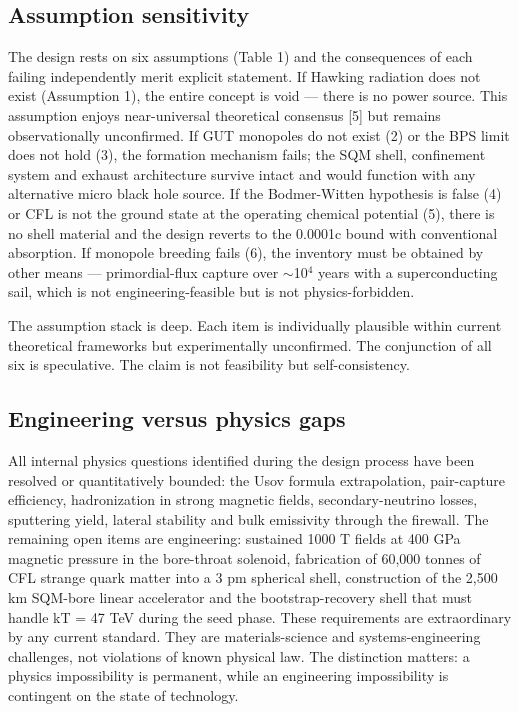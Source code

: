 \documentclass[12pt,a4paper]{article}
\begin{document}
\subsection{Assumption sensitivity}
The design rests on six assumptions (Table 1) and the consequences of each failing independently merit explicit statement. If Hawking radiation does not exist (Assumption 1), the entire concept is void --- there is no power source. This assumption enjoys near-universal theoretical consensus [5] but remains observationally unconfirmed. If GUT monopoles do not exist (2) or the BPS limit does not hold (3), the formation mechanism fails; the SQM shell, confinement system and exhaust architecture survive intact and would function with any alternative micro black hole source. If the Bodmer-Witten hypothesis is false (4) or CFL is not the ground state at the operating chemical potential (5), there is no shell material and the design reverts to the 0.0001c bound with conventional absorption. If monopole breeding fails (6), the inventory must be obtained by other means --- primordial-flux capture over $\sim$10$^{4}$ years with a superconducting sail, which is not engineering-feasible but is not physics-forbidden.

The assumption stack is deep. Each item is individually plausible within current theoretical frameworks but experimentally unconfirmed. The conjunction of all six is speculative. The claim is not feasibility but self-consistency.

\subsection{Engineering versus physics gaps}
All internal physics questions identified during the design process have been resolved or quantitatively bounded: the Usov formula extrapolation, pair-capture efficiency, hadronization in strong magnetic fields, secondary-neutrino losses, sputtering yield, lateral stability and bulk emissivity through the firewall. The remaining open items are engineering: sustained 1000 T fields at 400 GPa magnetic pressure in the bore-throat solenoid, fabrication of 60,000 tonnes of CFL strange quark matter into a 3 pm spherical shell, construction of the 2,500 km SQM-bore linear accelerator and the bootstrap-recovery shell that must handle kT = 47 TeV during the seed phase. These requirements are extraordinary by any current standard. They are materials-science and systems-engineering challenges, not violations of known physical law. The distinction matters: a physics impossibility is permanent, while an engineering impossibility is contingent on the state of technology.
\end{document}
